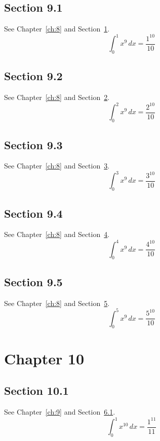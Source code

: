 \documentclass{book}
\begin{document}
\section{Section 9.1}\label{sec:9-1}
See Chapter~\ref{ch:8} and Section~\ref{sec:9-1}.
\lipsum[47-49]
\begin{equation}\label{eq:9-1} \int_0^{1} x^{9}\,dx = \frac{1^{10}}{10}\end{equation}
\section{Section 9.2}\label{sec:9-2}
See Chapter~\ref{ch:8} and Section~\ref{sec:9-2}.
\lipsum[48-50]
\begin{equation}\label{eq:9-2} \int_0^{2} x^{9}\,dx = \frac{2^{10}}{10}\end{equation}
\section{Section 9.3}\label{sec:9-3}
See Chapter~\ref{ch:8} and Section~\ref{sec:9-3}.
\lipsum[49-51]
\begin{equation}\label{eq:9-3} \int_0^{3} x^{9}\,dx = \frac{3^{10}}{10}\end{equation}
\section{Section 9.4}\label{sec:9-4}
See Chapter~\ref{ch:8} and Section~\ref{sec:9-4}.
\lipsum[50-52]
\begin{equation}\label{eq:9-4} \int_0^{4} x^{9}\,dx = \frac{4^{10}}{10}\end{equation}
\section{Section 9.5}\label{sec:9-5}
See Chapter~\ref{ch:8} and Section~\ref{sec:9-5}.
\lipsum[51-53]
\begin{equation}\label{eq:9-5} \int_0^{5} x^{9}\,dx = \frac{5^{10}}{10}\end{equation}
\chapter{Chapter 10}\label{ch:10}
\section{Section 10.1}\label{sec:10-1}
See Chapter~\ref{ch:9} and Section~\ref{sec:10-1}.
\lipsum[52-54]
\begin{equation}\label{eq:10-1} \int_0^{1} x^{10}\,dx = \frac{1^{11}}{11}\end{equation}
\end{document}
